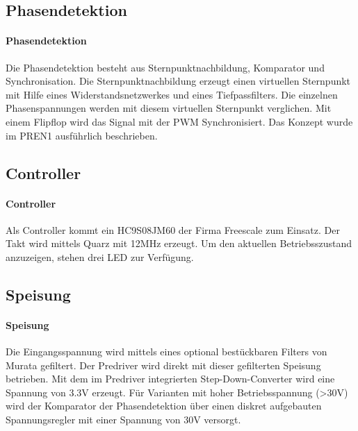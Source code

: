 \ifSTANDALONE
\subsection{Phasendetektion}
\fi
\ifEMBED
\paragraph{Phasendetektion}$~~$\vspace{2mm}\\
\fi
Die Phasendetektion besteht aus Sternpunktnachbildung, Komparator und 
Synchronisation. Die Sternpunktnachbildung erzeugt einen virtuellen Sternpunkt 
mit Hilfe eines Widerstandsnetzwerkes und eines Tiefpassfilters. Die einzelnen 
Phasenspannungen werden mit diesem virtuellen Sternpunkt verglichen. Mit einem 
Flipflop wird das Signal mit der PWM Synchronisiert.
\ifEMBED 
Das Konzept wurde im PREN1 \cite{Team32:Doku} ausführlich beschrieben.
\fi

\ifSTANDALONE
\subsection{Controller}
\fi
\ifEMBED
\paragraph{Controller}$~~$\vspace{2mm}\\
\fi
Als Controller kommt ein HC9S08JM60 der Firma Freescale zum Einsatz. Der Takt 
wird mittels Quarz mit 12MHz erzeugt. Um den aktuellen Betriebsszustand 
anzuzeigen, stehen drei LED zur Verfügung. 

\ifSTANDALONE
\subsection{Speisung}
\fi
\ifEMBED
\paragraph{Speisung}$~~$\vspace{2mm}\\
\fi
Die Eingangsspannung wird mittels eines optional bestückbaren Filters von 
Murata gefiltert. Der Predriver wird direkt mit dieser gefilterten Speisung 
betrieben. Mit dem im Predriver integrierten Step-Down-Converter wird eine 
Spannung von 3.3\si{\volt} erzeugt. Für Varianten mit hoher Betriebsspannung (>30\si{\volt}) 
wird der Komparator der Phasendetektion über einen diskret aufgebauten 
Spannungsregler mit einer Spannung von 30\si{\volt} versorgt. 

